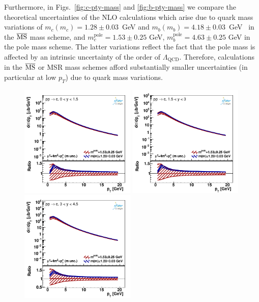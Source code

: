 \documentclass[12pt,a4paper]{article}
\newcommand{\msbar}{\ensuremath{\overline{\rm MS}}\xspace}
\newcommand{\polem}[1][]{\ensuremath{m_{#1}^{\text{pole}}}\xspace}
\begin{document}
Furthermore, in Figs.~\ref{fig:c-pty-mass} and \ref{fig:b-pty-mass} we compare the theoretical uncertainties of the NLO calculations which arise due to quark mass variations of $m_c(m_c) = 1.28 \pm 0.03$~GeV and $m_b(m_b) = 4.18 \pm 0.03$~GeV~\cite{Tanabashi:2018oca} in the \msbar mass scheme, and $\polem[c] = 1.53 \pm 0.25$ GeV, $\polem[b] = 4.63 \pm 0.25$ GeV in the pole mass scheme. The latter variations reflect the fact that the pole mass is affected by an intrinsic uncertainty of the order of $\Lambda_{\text{QCD}}$. Therefore, calculations in the \msbar or MSR mass schemes afford substantially smaller uncertainties (in particular at low $p_T$) due to quark mass variations.

\begin{figure}
    \centering
    \includegraphics[width=0.49\textwidth]{figs/parton-ptmax20/dyn-therr-mass/data_401-1.pdf}
    \includegraphics[width=0.49\textwidth]{figs/parton-ptmax20/dyn-therr-mass/data_401-2.pdf}
    \includegraphics[width=0.49\textwidth]{figs/parton-ptmax20/dyn-therr-mass/data_401-3.pdf}

\end{figure}
\end{document}
